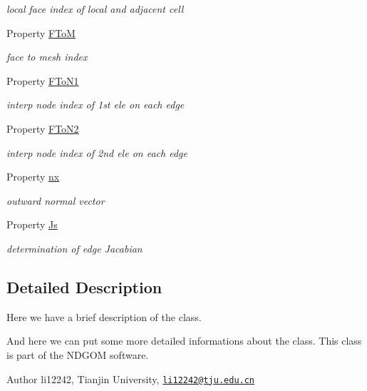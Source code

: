 \begin{DoxyCompactItemize}
\begin{DoxyCompactList}\small\item\em local face index of local and adjacent cell \end{DoxyCompactList}\item 
Property \hyperlink{class_ndg_inner_edge_ac7b4dafe02dfe37c5fba64eb5f82fccd}{F\+ToM}
\begin{DoxyCompactList}\small\item\em face to mesh index \end{DoxyCompactList}\item 
Property \hyperlink{class_ndg_inner_edge_ae653948e87f4df4d22c99bad306a58fd}{F\+To\+N1}
\begin{DoxyCompactList}\small\item\em interp node index of 1st ele on each edge \end{DoxyCompactList}\item 
Property \hyperlink{class_ndg_inner_edge_ac3f90182ff721d3a4f535c64465f155b}{F\+To\+N2}
\begin{DoxyCompactList}\small\item\em interp node index of 2nd ele on each edge \end{DoxyCompactList}\item 
Property \hyperlink{class_ndg_inner_edge_afb749ea9b90c421eff467b6b9f8a9712}{nx}
\begin{DoxyCompactList}\small\item\em outward normal vector \end{DoxyCompactList}\item 
Property \hyperlink{class_ndg_inner_edge_abccf4e01093719e11cb97544cc5e9096}{Js}
\begin{DoxyCompactList}\small\item\em determination of edge Jacabian \end{DoxyCompactList}\end{DoxyCompactItemize}


\subsection{Detailed Description}
Here we have a brief description of the class. 

And here we can put some more detailed informations about the class. This class is part of the N\+D\+G\+OM software. \begin{DoxyAuthor}{Author}
li12242, Tianjin University, \href{mailto:li12242@tju.edu.cn}{\tt li12242@tju.\+edu.\+cn} 
\end{DoxyAuthor}


